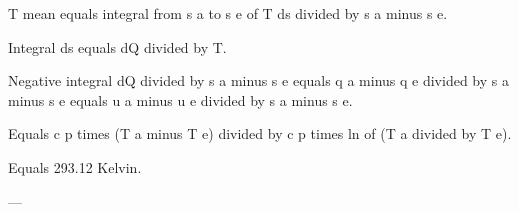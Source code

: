 T mean equals integral from s a to s e of T ds divided by s a minus s e.  

Integral ds equals dQ divided by T.  

Negative integral dQ divided by s a minus s e equals q a minus q e divided by s a minus s e equals u a minus u e divided by s a minus s e.  

Equals c p times (T a minus T e) divided by c p times ln of (T a divided by T e).  

Equals 293.12 Kelvin.  

---